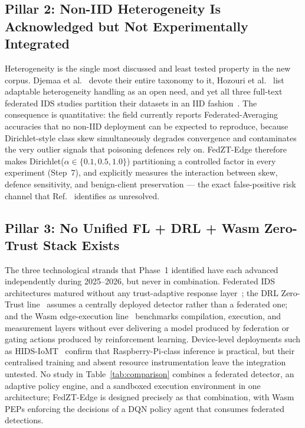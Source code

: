 \documentclass[11pt,a4paper]{article}
\begin{document}
\subsection{Pillar 2: Non-IID Heterogeneity Is Acknowledged but Not
Experimentally Integrated}\label{sec:gap2}

Heterogeneity is the single most discussed and least tested property in
the new corpus. Djemaa et al.~\cite{djemaa2026} devote their entire
taxonomy to it, Hozouri et al.~\cite{hozouri2025} list adaptable
heterogeneity handling as an open need, and yet all three full-text
federated IDS studies partition their datasets in an IID
fashion~\cite{albogami2025,karunamurthy2025}. The consequence is
quantitative: the field currently reports Federated-Averaging accuracies
that no non-IID deployment can be expected to reproduce, because Dirichlet-style
class skew simultaneously degrades convergence and contaminates the very
outlier signals that poisoning defences rely on. FedZT-Edge therefore
makes Dirichlet($\alpha \in \{0.1, 0.5, 1.0\}$) partitioning a controlled
factor in every experiment (Step~7), and explicitly measures the
interaction between skew, defence sensitivity, and benign-client
preservation --- the exact false-positive risk channel that
Ref.~\cite{djemaa2026} identifies as unresolved.

\subsection{Pillar 3: No Unified FL + DRL + Wasm Zero-Trust Stack Exists}
\label{sec:gap3}

The three technological strands that Phase~1 identified have each advanced
independently during 2025--2026, but never in combination. Federated IDS
architectures matured without any trust-adaptive response
layer~\cite{albogami2025,karunamurthy2025,bensaid2025}; the DRL Zero-Trust
line~\cite{mahida2026} assumes a centrally deployed detector rather than a
federated one; and the Wasm edge-execution line~\cite{weber2026,zhang2025}
benchmarks compilation, execution, and measurement layers without ever
delivering a model produced by federation or gating actions produced by
reinforcement learning. Device-level deployments such as
HIDS-IoMT~\cite{berguiga2025} confirm that Raspberry-Pi-class inference is
practical, but their centralised training and absent resource
instrumentation leave the integration untested. No study in
Table~\ref{tab:comparison} combines a federated detector, an adaptive
policy engine, and a sandboxed execution environment in one architecture;
FedZT-Edge is designed precisely as that combination, with Wasm PEPs
enforcing the decisions of a DQN policy agent that consumes federated
detections.
\end{document}
